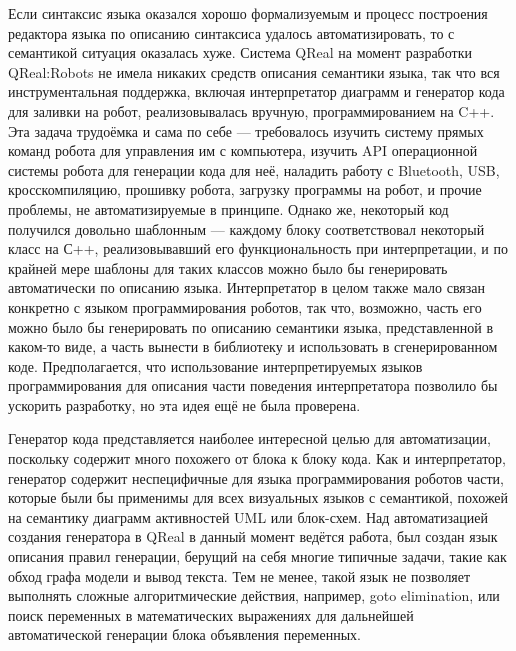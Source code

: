 \documentclass[a4paper]{article}
\begin{document}
Если синтаксис языка оказался хорошо формализуемым и процесс построения редактора языка по описанию синтаксиса удалось автоматизировать, то с семантикой ситуация оказалась хуже. Система QReal на момент разработки QReal:Robots не имела никаких средств описания семантики языка, так что вся инструментальная поддержка, включая интерпретатор диаграмм и генератор кода для заливки на робот, реализовывалась вручную, программированием на C++. Эта задача трудоёмка и сама по себе --- требовалось изучить систему прямых команд робота для управления им с компьютера, изучить API операционной системы робота для генерации кода для неё, наладить работу с Bluetooth, USB, кросскомпиляцию, прошивку робота, загрузку программы на робот, и прочие проблемы, не автоматизируемые в принципе. Однако же, некоторый код получился довольно шаблонным --- каждому блоку соответствовал некоторый класс на С++, реализовывавший его функциональность при интерпретации, и по крайней мере шаблоны для таких классов можно было бы генерировать автоматически по описанию языка. Интерпретатор в целом также мало связан конкретно с языком программирования роботов, так что, возможно, часть его можно было бы генерировать по описанию семантики языка, представленной в каком-то виде, а часть вынести в библиотеку и использовать в сгенерированном коде. Предполагается, что использование интерпретируемых языков программирования для описания части поведения интерпретатора позволило бы ускорить разработку, но эта идея ещё не была проверена.

Генератор кода представляется наиболее интересной целью для автоматизации, поскольку содержит много похожего от блока к блоку кода. Как и интерпретатор, генератор содержит неспецифичные для языка программирования роботов части, которые были бы применимы для всех визуальных языков с семантикой, похожей на семантику диаграмм активностей UML или блок-схем. Над автоматизацией создания генератора в QReal в данный момент ведётся работа, был создан язык описания правил генерации, берущий на себя многие типичные задачи, такие как обход графа модели и вывод текста. Тем не менее, такой язык не позволяет выполнять сложные алгоритмические действия, например, goto elimination, или поиск переменных в математических выражениях для дальнейшей автоматической генерации блока объявления переменных.
\end{document}
